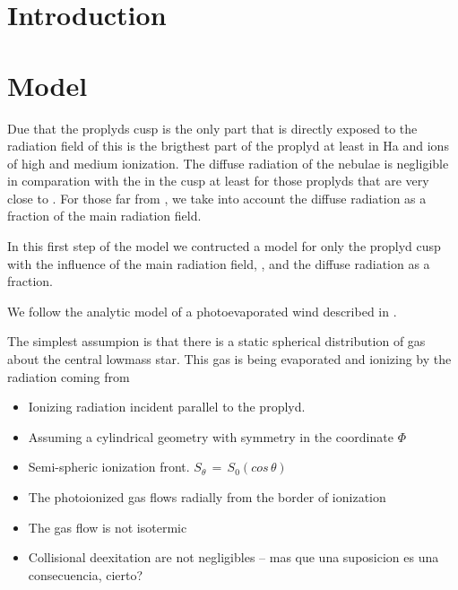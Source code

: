 \documentclass[aaspp]{article}
\begin{document}


\section{Introduction}
\label{sec:introduction}


\section{Model}
\label{sec:model}

Due that the proplyds cusp is the only part that is directly exposed to the radiation field of \tc this is the brigthest part of the proplyd at least in Ha and ions of high and medium ionization. The diffuse radiation of the nebulae is negligible in comparation with the \tc in the cusp at least for those proplyds that are very close to \tc. For those far from \tc, we take into account the diffuse radiation as a fraction of the main radiation field.

In this first step of the model we contructed a model for only the proplyd cusp with the influence of the main radiation field, \tc, and the diffuse radiation as a \tc fraction.

We follow the analytic model of a photoevaporated wind described in \citet{1998AJ....116..322H}.
 
The simplest assumpion is that there is a static spherical distribution of gas about the central lowmass star. This gas is being evaporated and ionizing by the radiation coming from \tc

\begin{itemize}
\item{Ionizing radiation incident parallel to the proplyd.}
\item{Assuming a cylindrical geometry with symmetry in the coordinate $\Phi$}
\item{Semi-spheric ionization front. $S_{\theta} \, = \, S_0 (cos \, \theta)$}
\item{The photoionized gas flows radially from the border of ionization}
\item{The gas flow is not isotermic}
\item{Collisional deexitation are not negligibles -- mas que una suposicion es una consecuencia, cierto?}
\end{itemize}
\end{document}
